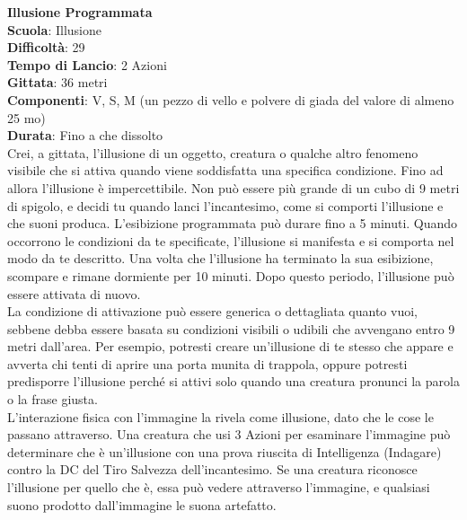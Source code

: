 \begin{multicols}{2}
\medskip\textbf{Illusione Programmata}\\
\textbf{Scuola}: Illusione\\
\textbf{Difficoltà}: 29\\
\textbf{Tempo di Lancio}: 2 Azioni\\
\textbf{Gittata}: 36 metri\\
\textbf{Componenti}: V, S, M (un pezzo di vello e polvere di giada del valore di almeno 25 mo)\\
\textbf{Durata}: Fino a che dissolto\\
Crei, a gittata, l'illusione di un oggetto, creatura o qualche altro fenomeno visibile che si attiva quando viene soddisfatta una specifica condizione. Fino ad allora l'illusione è impercettibile. Non può essere più grande di un cubo di 9 metri di spigolo, e decidi tu quando lanci l'incantesimo, come si comporti l'illusione e che suoni produca. L'esibizione programmata può durare fino a 5 minuti. Quando occorrono le condizioni da te specificate, l'illusione si manifesta e si comporta nel modo da te descritto. Una volta che l'illusione ha terminato la sua esibizione, scompare e rimane dormiente per 10 minuti. Dopo questo periodo, l'illusione può essere attivata di nuovo.\\
La condizione di attivazione può essere generica o dettagliata quanto vuoi, sebbene debba essere basata su condizioni visibili o udibili che avvengano entro 9 metri dall'area. Per esempio, potresti creare un'illusione di te stesso che appare e avverta chi tenti di aprire una porta munita di trappola, oppure potresti predisporre l'illusione perché si attivi solo quando una creatura pronunci la parola o la frase giusta.\\
L'interazione fisica con l'immagine la rivela come illusione, dato che le cose le passano attraverso. Una creatura che usi 3 Azioni per esaminare l'immagine può determinare che è un'illusione con una prova riuscita di Intelligenza (Indagare) contro la DC del Tiro Salvezza dell'incantesimo. Se una creatura riconosce l'illusione per quello che è, essa può vedere attraverso l'immagine, e qualsiasi suono prodotto dall'immagine le suona artefatto.


\end{multicols}
